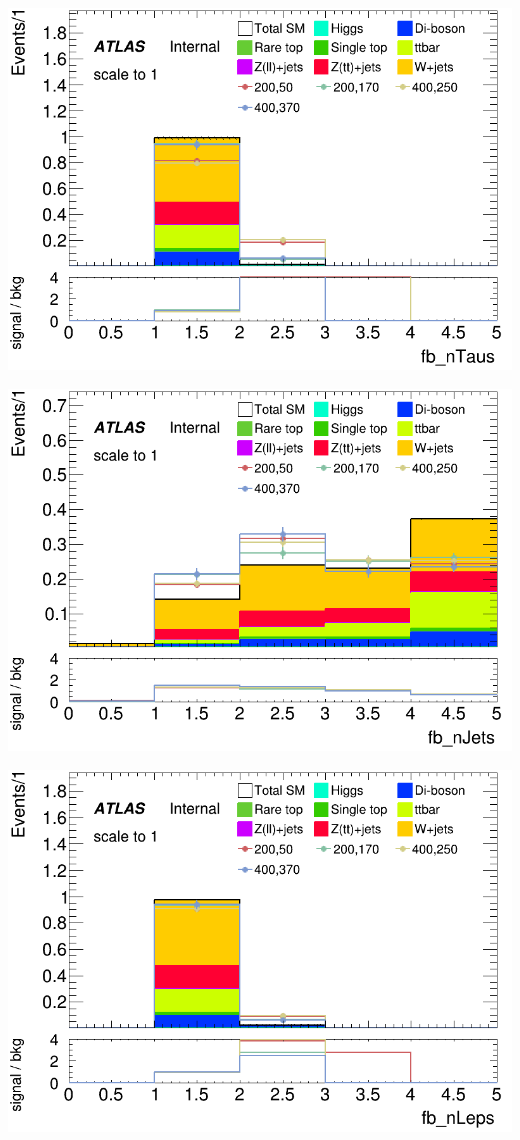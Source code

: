 \documentclass[usenames,dvipsnames]{beamer}
\begin{document}
\begin{frame}
\begin{minipage}{0.2\textwidth}
        \centering
        \includegraphics[width=\textwidth]{graphics/LH_met_sig/LH_fb_nTaus_norm.png}
    \end{minipage}
    \hfill
    \begin{minipage}{0.2\textwidth}
        \centering
        \includegraphics[width=\textwidth]{graphics/LH_met_sig/LH_fb_nJets_norm.png}
    \end{minipage}
    \begin{minipage}{0.2\textwidth}
        \centering
        \includegraphics[width=\textwidth]{graphics/LH_met_sig/LH_fb_nLeps_norm.png}

\end{minipage}
\end{frame}
\end{document}
